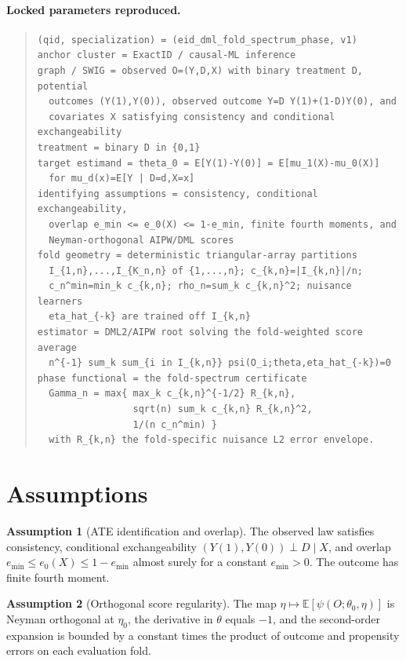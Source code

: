 \documentclass[11pt]{article}
\newcommand{\E}{\mathbb{E}}
\theoremstyle{definition}
\newtheorem{assumption}{Assumption}
\theoremstyle{plain}
\theoremstyle{remark}
\begin{document}
\paragraph{Locked parameters reproduced.}
\begin{quote}\small
\begin{verbatim}
(qid, specialization) = (eid_dml_fold_spectrum_phase, v1)
anchor cluster = ExactID / causal-ML inference
graph / SWIG = observed O=(Y,D,X) with binary treatment D, potential
  outcomes (Y(1),Y(0)), observed outcome Y=D Y(1)+(1-D)Y(0), and
  covariates X satisfying consistency and conditional exchangeability
treatment = binary D in {0,1}
target estimand = theta_0 = E[Y(1)-Y(0)] = E[mu_1(X)-mu_0(X)]
  for mu_d(x)=E[Y | D=d,X=x]
identifying assumptions = consistency, conditional exchangeability,
  overlap e_min <= e_0(X) <= 1-e_min, finite fourth moments, and
  Neyman-orthogonal AIPW/DML scores
fold geometry = deterministic triangular-array partitions
  I_{1,n},...,I_{K_n,n} of {1,...,n}; c_{k,n}=|I_{k,n}|/n;
  c_n^min=min_k c_{k,n}; rho_n=sum_k c_{k,n}^2; nuisance learners
  eta_hat_{-k} are trained off I_{k,n}
estimator = DML2/AIPW root solving the fold-weighted score average
  n^{-1} sum_k sum_{i in I_{k,n}} psi(O_i;theta,eta_hat_{-k})=0
phase functional = the fold-spectrum certificate
  Gamma_n = max{ max_k c_{k,n}^{-1/2} R_{k,n},
                 sqrt(n) sum_k c_{k,n} R_{k,n}^2,
                 1/(n c_n^min) }
  with R_{k,n} the fold-specific nuisance L2 error envelope.
\end{verbatim}
\end{quote}

\section{Assumptions}
\begin{assumption}[ATE identification and overlap]\label{ass:id}
The observed law satisfies consistency, conditional exchangeability \((Y(1),Y(0))\perp D\mid X\), and overlap \(e_{\min}\le e_0(X)\le1-e_{\min}\) almost surely for a constant \(e_{\min}>0\). The outcome has finite fourth moment.
\end{assumption}

\begin{assumption}[Orthogonal score regularity]\label{ass:orth}
The map \(\eta\mapsto \E[\psi(O;\theta_0,\eta)]\) is Neyman orthogonal at \(\eta_0\), the derivative in \(\theta\) equals \(-1\), and the second-order expansion is bounded by a constant times the product of outcome and propensity errors on each evaluation fold.
\end{assumption}
\end{document}
